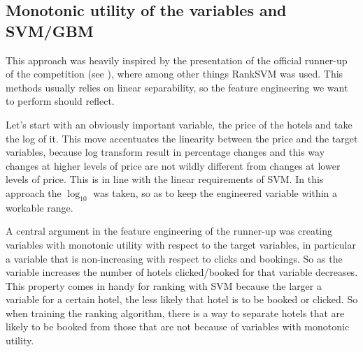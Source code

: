 \documentclass{llncs}
\begin{document}
\subsection{Monotonic utility of the variables and SVM/GBM}
This approach was heavily inspired by the presentation of the official runner-up of the competition (see \cite{WinNT2}), where among other things RankSVM was used. This methods usually relies on linear separability, so the feature engineering we want to perform should reflect.

Let's start with an obviously important variable, the price of the hotels and take the log of it. This move accentuates the linearity between the price and the target variables, because log transform result in percentage changes and this way changes at higher levels of price are not wildly different from changes at lower levels of price. This is in line with the linear requirements of SVM. In this approach the $\log_{10}$ was taken, so as to keep the engineered variable within a workable range.

A central argument in the feature engineering of the runner-up was creating variables with monotonic utility with respect to the target variables, in particular a variable that is non-increasing with respect to clicks and bookings. So as the variable increases the number of hotels clicked/booked for that variable decreases. This property comes in handy for ranking with SVM because the larger a variable for a certain hotel, the less likely that hotel is to be booked or clicked. So when training the ranking algorithm, there is a way to separate hotels that are likely to be booked from those that are not because of variables with monotonic utility.
\end{document}
